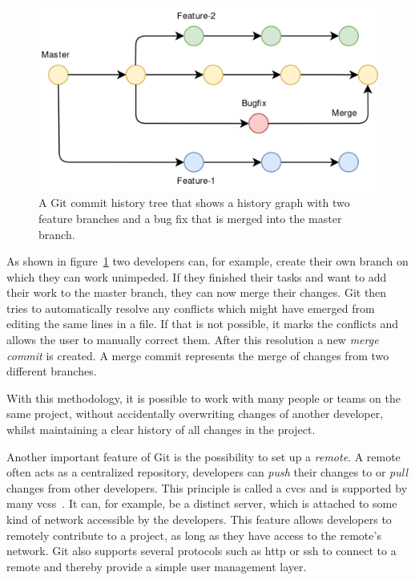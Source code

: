 \begin{figure}[H]
    \includegraphics[scale=0.35]{./graphs/git-history-branch}
    \centering
    \caption{A Git commit history tree that shows a history graph with two feature branches and a bug fix that is merged into the master branch.}\label{fig:git-commit-tree}
\end{figure}

As shown in figure~\ref{fig:git-commit-tree} two developers can, for example, create their own branch on which they can work unimpeded.
If they finished their tasks and want to add their work to the master branch, they can now merge their changes.
Git then tries to automatically resolve any conflicts which might have emerged from editing the same lines in a file.
If that is not possible, it marks the conflicts and allows the user to manually correct them.
After this resolution a new \emph{merge commit} is created.
A merge commit represents the merge of changes from two different branches.

With this methodology, it is possible to work with many people or teams on the same project, without accidentally overwriting changes of another developer, whilst maintaining a clear history of all changes in the project.

Another important feature of Git is the possibility to set up a \emph{remote}.
A remote often acts as a centralized repository, developers can \emph{push} their changes to or \emph{pull} changes from other developers.
This principle is called a \ac{cvcs} and is supported by many \acp{vcs}~\cite{version-control}.
It can, for example, be a distinct server, which is attached to some kind of network accessible by the developers.
This feature allows developers to remotely contribute to a project, as long as they have access to the remote's network.
Git also supports several protocols such as \ac{http} or \ac{ssh} to connect to a remote and thereby provide a simple user management layer.


